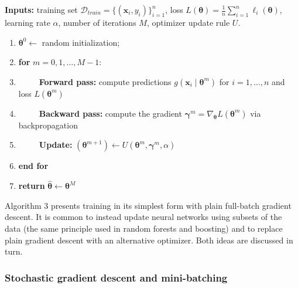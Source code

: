 \documentclass[
  letterpaper,
  krantz2]{style/krantz}
\providecommand{\tightlist}{%
  \setlength{\itemsep}{0pt}\setlength{\parskip}{0pt}}
\begin{document}
\begin{tcolorbox}[enhanced jigsaw, toprule=.15mm, bottomtitle=1mm, opacityback=0, breakable, leftrule=.75mm, title={Algorithm 3 (Full-batch plain gradient descent training of a neural
network)}, toptitle=1mm, bottomrule=.15mm, colback=white, colframe=quarto-callout-note-color-frame, titlerule=0mm, opacitybacktitle=0.6, coltitle=black, rightrule=.15mm, left=2mm, colbacktitle=quarto-callout-note-color!10!white, arc=.35mm]

\textbf{Inputs:} training set
\(\mathcal{D}_{train}= \{(\mathbf{x}_i, y_i)\}_{i=1}^{n}\), loss
\(L(\boldsymbol{\theta}) = \tfrac{1}{n}\sum_{i=1}^{n} \ell_i(\boldsymbol{\theta})\),
learning rate \(\alpha\), number of iterations \(M\), optimizer update
rule \(U\).

\begin{enumerate}
\def\labelenumi{\arabic{enumi}.}
\tightlist
\item
  \(\boldsymbol{\theta}^{0} \gets\) random initialization;
\item
  \textbf{for} \(m = 0, 1, \ldots, M - 1\):
\item
  ~~~~~\textbf{Forward pass:} compute predictions
  \(g(\mathbf{x}_i \mid \boldsymbol{\theta}^{m})\) for
  \(i = 1, \ldots, n\) and loss \(L(\boldsymbol{\theta}^{m})\)
\item
  ~~~~~\textbf{Backward pass:} compute the gradient
  \(\boldsymbol{\gamma}^{m} = \nabla_{\boldsymbol{\theta}} L(\boldsymbol{\theta}^{m})\)
  via backpropagation
\item
  ~~~~~\textbf{Update:}
  \((\boldsymbol{\theta}^{m+1}) \gets U(\boldsymbol{\theta}^{m}, \boldsymbol{\gamma}^{m}, \alpha)\)
\item
  \textbf{end for}
\item
  \textbf{return}
  \(\hat{\boldsymbol{\theta}} \gets \boldsymbol{\theta}^{M}\)
\end{enumerate}

\end{tcolorbox}

Algorithm 3 presents training in its simplest form with plain full-batch
gradient descent. It is common to instead update neural networks using
subsets of the data (the same principle used in random forests and
boosting) and to replace plain gradient descent with an alternative
optimizer. Both ideas are discussed in turn.

\subsubsection{Stochastic gradient descent and
mini-batching}\label{sec-nn-batches}
\end{document}
